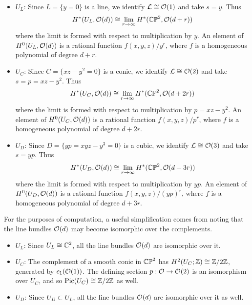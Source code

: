 \documentclass[12pt]{amsart}
\begin{document}
\begin{itemize}
\item $U_L$: Since $L = \{y=0\}$ is a line, we identify $\mathcal{L} \cong \mathcal{O}(1)$ and
  take $s = y$. Thus
  \begin{equation}
    H^*(U_L,\mathcal{O}(d)) \cong \lim_{r\to \infty} H^*(\mathbb{CP}^2,\mathcal{O}(d+r))
  \end{equation}
  where the limit is formed with respect to multiplication by $y$. An
  element of $H^0(U_L,\mathcal{O}(d))$ is a rational function $f(x,y,z)/y^r$,
  where $f$ is a homogeneous polynomial of degree $d+r$.
\item $U_C$: Since $C = \{xz-y^2 = 0\}$ is a conic, we identify $\mathcal{L}
  \cong \mathcal{O}(2)$ and take $s = p = xz-y^2$. Thus
  \begin{equation}
    H^*(U_C,\mathcal{O}(d)) \cong \lim_{r\to \infty} H^*(\mathbb{CP}^2,\mathcal{O}(d+2r))
  \end{equation}
  where the limit is formed with respect to multiplication by $p =
  xz-y^2$.  An element of $H^0(U_C,\mathcal{O}(d))$ is a rational function
  $f(x,y,z)/p^r$, where $f$ is a homogeneous polynomial of degree
  $d+2r$.
\item $U_D$: Since $D = \{yp = xyz-y^3 = 0\}$ is a cubic, we identify
  $\mathcal{L} \cong \mathcal{O}(3)$ and take $s = yp$. Thus
  \begin{equation}
    H^*(U_D,\mathcal{O}(d)) \cong \lim_{r \to \infty} H^*(\mathbb{CP}^2,\mathcal{O}(d+3r))
  \end{equation}
  where the limit is formed with respect to multiplication by $yp$. An
  element of $H^0(U_D,\mathcal{O}(d))$ is a rational function
  $f(x,y,z)/(yp)^r$, where $f$ is a homogeneous polynomial of degree
  $d+3r$.
\end{itemize}

For the purposes of computation, a useful simplification comes from
noting that the line bundles $\mathcal{O}(d)$ may become isomorphic over
the complements.

\begin{itemize}
\item $U_L$: Since $U_L \cong \mathbb{C}^2$, all the line bundles $\mathcal{O}(d)$ are
  isomorphic over it.
\item $U_C$: The complement of a smooth conic in $\mathbb{CP}^2$ has
  $H^2(U_C;\mathbb{Z}) \cong \mathbb{Z}/2\mathbb{Z}$, generated by $c_1(\mathcal{O}(1))$. The defining
  section $p: \mathcal{O}\to \mathcal{O}(2)$ is an isomorphism over $U_C$, and so $\operatorname{Pic}
  (U_C) \cong\mathbb{Z}/2\mathbb{Z}$ as well.
\item $U_D$: Since $U_D \subset U_L$, all the line bundles $\mathcal{O}(d)$
  are isomorphic over it as well.
\end{itemize}
\end{document}
